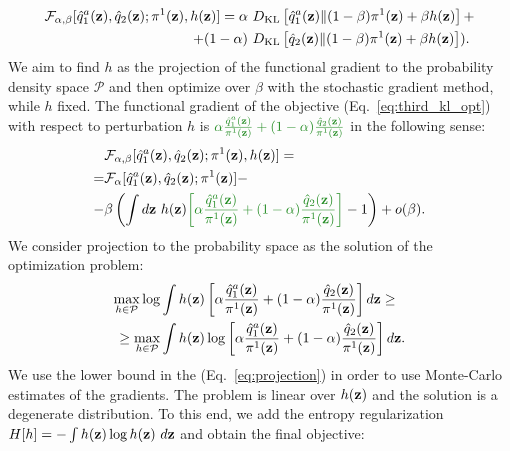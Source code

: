 \begin{equation}
\label{eq:objective}
    \begin{aligned}
    \mathcal{F}_{\alpha, \beta}[\hat{q}_{1}^{a}(\rvz),\hat{q}_{2}(\rvz);\pi^{1}(\rvz),h(\rvz)] = \alpha&~\KL{\hat{q}_{1}^{a}(\rvz)}{(1-\beta)\pi^{1}(\rvz)+\beta h(\rvz)} + \\
    + (1-\alpha)&~\KL{\hat{q}_{2}(\rvz)}{(1-\beta)\pi^{1}(\rvz)+\beta h(\rvz)}).
    \end{aligned}
\end{equation}
We aim to find $h$ as the projection of the functional gradient to the probability density space $\mathcal{P}$ and then optimize over $\beta$ with the stochastic gradient method, while $h$ fixed. The functional gradient of the objective (Eq.~\ref{eq:third_kl_opt}) with respect to perturbation $h$ is $\color{ForestGreen}{\alpha\frac{\hat{q}_{1}^{a}(\rvz)}{\pi^{1}(\rvz)} + (1-\alpha)\frac{\hat{q}_{2}(\rvz)}{\pi^{1}(\rvz)}}$ in the following sense:
\begin{equation}
    \begin{aligned}
    & \mathcal{F}_{\alpha, \beta}[\hat{q}_{1}^{a}(\rvz),\hat{q}_{2}(\rvz);\pi^{1}(\rvz),h(\rvz)] = \\ 
    = & \mathcal{F}_{\alpha}[\hat{q}_{1}^{a}(\rvz),\hat{q}_{2}(\rvz);\pi^{1}(\rvz)] - \\
    - &\beta\left(\int d\rvz~h(\rvz){\color{ForestGreen}{\left[\alpha \frac{\hat{q}_{1}^{a}(\rvz)}{\pi^{1}(\rvz)} + (1-\alpha)\frac{\hat{q}_{2}(\rvz)}{\pi^{1}(\rvz)}\right]}} - 1\right) + o(\beta).
    \end{aligned}
\end{equation}
We consider projection to the probability space as the solution of the optimization problem:
\begin{equation}
\label{eq:projection}
\begin{aligned}
 \max\limits_{h\in\mathcal{P}}\log & \int h(\rvz) \left[\alpha \frac{\hat{q}_{1}^{a}(\rvz)}{\pi^{1}(\rvz)} + (1-\alpha)\frac{\hat{q}_{2}(\rvz)}{\pi^{1}(\rvz)}\right]d\rvz \geq \\
 \geq \max\limits_{h\in\mathcal{P}}& \int h(\rvz)\log \left[\alpha \frac{\hat{q}_{1}^{a}(\rvz)}{\pi^{1}(\rvz)} + (1-\alpha)\frac{\hat{q}_{2}(\rvz)}{\pi^{1}(\rvz)} \right]d\rvz.
\end{aligned}
\end{equation}
We use the lower bound in the (Eq.~\ref{eq:projection}) in order to use Monte-Carlo estimates of the gradients. The problem is linear over $h({\mathbf{z}})$ and the solution is a degenerate distribution. To this end, we add the entropy regularization $H[h]=-\int h({\mathbf{z}}) \log h({\mathbf{z}}) ~d{\mathbf{z}}$ and obtain the final objective:
